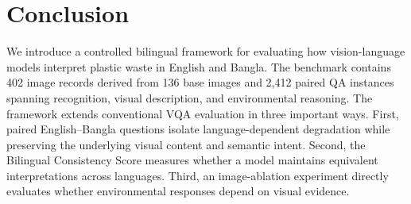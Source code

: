\documentclass{article}
\begin{document}
% 








\section{Conclusion}
\label{sec:conclusion}
% 

We introduce a controlled bilingual framework for evaluating how vision-language models interpret plastic waste in English and Bangla. The benchmark contains 402 image records derived from 136 base images and 2,412 paired QA instances spanning recognition, visual description, and environmental reasoning. The framework extends conventional VQA evaluation in three important ways. First, paired English--Bangla questions isolate language-dependent degradation while preserving the underlying visual content and semantic intent. Second, the Bilingual Consistency Score measures whether a model maintains equivalent interpretations across languages. Third, an image-ablation experiment directly evaluates whether environmental responses depend on visual evidence.
\end{document}
